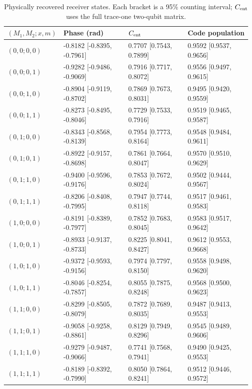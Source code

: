 \documentclass[10pt,a4paper]{article}
\begin{document}
\par\begin{table}[htbp]\centering\small
\caption{Physically recovered receiver states. Each bracket is a 95\% counting interval; $C_{\rm ent}$ uses the full trace-one two-qubit matrix.}\label{stab:state_physical}
\begin{tabular}{llll}\toprule
$(M_1,M_2;x,m)$ & Phase (rad) & $C_{\rm ent}$ & Code population\\\midrule
$(0,0;0,0)$ & -0.8182 [-0.8395, -0.7961] & 0.7707 [0.7543, 0.7899] & 0.9592 [0.9537, 0.9656] \\
$(0,0;0,1)$ & -0.9282 [-0.9486, -0.9069] & 0.7916 [0.7717, 0.8072] & 0.9556 [0.9497, 0.9615] \\
$(0,0;1,0)$ & -0.8904 [-0.9119, -0.8702] & 0.7869 [0.7673, 0.8031] & 0.9495 [0.9420, 0.9559] \\
$(0,0;1,1)$ & -0.8273 [-0.8495, -0.8046] & 0.7729 [0.7533, 0.7916] & 0.9519 [0.9465, 0.9587] \\
$(0,1;0,0)$ & -0.8343 [-0.8568, -0.8139] & 0.7954 [0.7773, 0.8164] & 0.9548 [0.9484, 0.9611] \\
$(0,1;0,1)$ & -0.8922 [-0.9157, -0.8698] & 0.7861 [0.7664, 0.8047] & 0.9570 [0.9510, 0.9629] \\
$(0,1;1,0)$ & -0.9400 [-0.9596, -0.9176] & 0.7853 [0.7672, 0.8024] & 0.9502 [0.9444, 0.9567] \\
$(0,1;1,1)$ & -0.8206 [-0.8408, -0.7995] & 0.7947 [0.7744, 0.8118] & 0.9517 [0.9461, 0.9583] \\
$(1,0;0,0)$ & -0.8191 [-0.8389, -0.7977] & 0.7852 [0.7683, 0.8045] & 0.9583 [0.9517, 0.9642] \\
$(1,0;0,1)$ & -0.8933 [-0.9137, -0.8733] & 0.8225 [0.8041, 0.8427] & 0.9612 [0.9553, 0.9668] \\
$(1,0;1,0)$ & -0.9372 [-0.9593, -0.9156] & 0.7974 [0.7797, 0.8150] & 0.9558 [0.9498, 0.9620] \\
$(1,0;1,1)$ & -0.8046 [-0.8254, -0.7857] & 0.8055 [0.7875, 0.8248] & 0.9568 [0.9500, 0.9623] \\
$(1,1;0,0)$ & -0.8299 [-0.8505, -0.8079] & 0.7872 [0.7689, 0.8035] & 0.9487 [0.9413, 0.9553] \\
$(1,1;0,1)$ & -0.9058 [-0.9258, -0.8861] & 0.8129 [0.7949, 0.8296] & 0.9545 [0.9489, 0.9606] \\
$(1,1;1,0)$ & -0.9279 [-0.9487, -0.9066] & 0.7741 [0.7568, 0.7941] & 0.9490 [0.9425, 0.9553] \\
$(1,1;1,1)$ & -0.8189 [-0.8392, -0.7990] & 0.8050 [0.7864, 0.8241] & 0.9512 [0.9446, 0.9572] \\
\bottomrule\end{tabular}\end{table}\par
\end{document}
